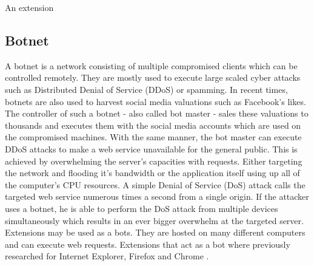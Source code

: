\documentclass[article,colorback,accentcolor=tud9c,type=bsc]{tudthesis}
\let\stdsubsection\subsection
\renewcommand\subsection{\newpage\stdsubsection}
\begin{document}
	An extension %
	
\subsection{Botnet}

	A botnet is a network consisting of multiple compromised clients which can be controlled remotely. They are mostly used to execute large scaled cyber attacks such as Distributed Denial of Service (DDoS) or spamming. In recent times, botnets are also used to harvest social media valuations such as Facebook's likes. The controller of such a botnet - also called bot master - sales these valuations to thousands and executes them with the social media accounts which are used on the compromised machines. With the same manner, the bot master can execute DDoS attacks to make a web service unavailable for the general public. This is achieved by overwhelming the server's capacities with requests. Either targeting the network and flooding it's bandwidth or the application itself using up all of the computer's CPU resources. A simple Denial of Service (DoS) attack calls the targeted web service numerous times a second from a single origin. If the attacker uses a botnet, he is able to perform the DoS attack from multiple devices simultaneously which results in an ever bigger overwhelm at the targeted server. \\
	
	Extensions may be used as a bots. They are hosted on many different computers and can execute web requests. 
	Extensions that act as a bot where previously researched for Internet Explorer, Firefox and Chrome \cite{liu2011botnet}.
	
	
\end{document}
